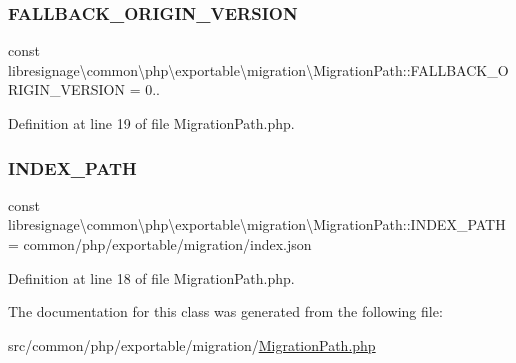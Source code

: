 \subsubsection{\texorpdfstring{F\+A\+L\+L\+B\+A\+C\+K\+\_\+\+O\+R\+I\+G\+I\+N\+\_\+\+V\+E\+R\+S\+I\+ON}{FALLBACK\_ORIGIN\_VERSION}}
{\footnotesize\ttfamily const libresignage\textbackslash{}common\textbackslash{}php\textbackslash{}exportable\textbackslash{}migration\textbackslash{}\+Migration\+Path\+::\+F\+A\+L\+L\+B\+A\+C\+K\+\_\+\+O\+R\+I\+G\+I\+N\+\_\+\+V\+E\+R\+S\+I\+ON = \textquotesingle{}0..\textquotesingle{}}



Definition at line 19 of file Migration\+Path.\+php.

\mbox{\label{classlibresignage_1_1common_1_1php_1_1exportable_1_1migration_1_1MigrationPath_af17153feccda5a3376b6058a4d0da6f9}} 
\subsubsection{\texorpdfstring{I\+N\+D\+E\+X\+\_\+\+P\+A\+TH}{INDEX\_PATH}}
{\footnotesize\ttfamily const libresignage\textbackslash{}common\textbackslash{}php\textbackslash{}exportable\textbackslash{}migration\textbackslash{}\+Migration\+Path\+::\+I\+N\+D\+E\+X\+\_\+\+P\+A\+TH = \textquotesingle{}common/php/exportable/migration/index.\+json\textquotesingle{}}



Definition at line 18 of file Migration\+Path.\+php.



The documentation for this class was generated from the following file\+:\begin{DoxyCompactItemize}
\item 
src/common/php/exportable/migration/\hyperlink{MigrationPath_8php}{Migration\+Path.\+php}\end{DoxyCompactItemize}
